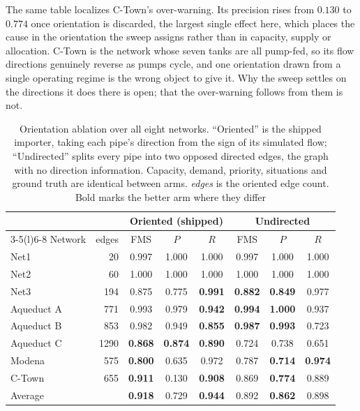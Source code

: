 \documentclass[11pt]{article}
\begin{document}
The same table localizes C-Town's over-warning. Its precision rises from $0.130$ to
$0.774$ once orientation is discarded, the largest single effect here, which places the
cause in the orientation the sweep assigns rather than in capacity, supply or
allocation. C-Town is the network whose seven tanks are all pump-fed, so its flow
directions genuinely reverse as pumps cycle, and one orientation drawn from a single
operating regime is the wrong object to give it. Why the sweep settles on the
directions it does there is open; that the over-warning follows from them is not.

\begin{table}[t]
\centering
\caption{Orientation ablation over all eight networks. ``Oriented'' is the shipped
importer, taking each pipe's direction from the sign of its simulated flow;
``Undirected'' splits every pipe into two opposed directed edges, the graph with no
direction information. Capacity, demand, priority, situations and ground truth are
identical between arms. \emph{edges} is the oriented edge count. Bold marks the better
arm where they differ}\label{tab:orient}
\small
\begin{tabular}{lrccc@{\hskip 1.5em}ccc}
\toprule
 & & \multicolumn{3}{c}{Oriented (shipped)} & \multicolumn{3}{c}{Undirected} \\
\cmidrule(lr){3-5}\cmidrule(l){6-8}
Network & edges & FMS & $P$ & $R$ & FMS & $P$ & $R$ \\
\midrule
Net1       &   20 & 0.997 & 1.000 & 1.000 & 0.997 & 1.000 & 1.000 \\
Net2       &   60 & 1.000 & 1.000 & 1.000 & 1.000 & 1.000 & 1.000 \\
Net3       &  194 & 0.875 & 0.775 & \textbf{0.991} & \textbf{0.882} & \textbf{0.849} & 0.977 \\
Aqueduct A &  771 & 0.993 & 0.979 & \textbf{0.942} & \textbf{0.994} & \textbf{1.000} & 0.937 \\
Aqueduct B &  853 & 0.982 & 0.949 & \textbf{0.855} & \textbf{0.987} & \textbf{0.993} & 0.723 \\
Aqueduct C & 1290 & \textbf{0.868} & \textbf{0.874} & \textbf{0.890} & 0.724 & 0.738 & 0.651 \\
Modena     &  575 & \textbf{0.800} & 0.635 & 0.972 & 0.787 & \textbf{0.714} & \textbf{0.974} \\
C-Town     &  655 & \textbf{0.911} & 0.130 & \textbf{0.908} & 0.869 & \textbf{0.774} & 0.889 \\
\midrule
Average    &      & \textbf{0.918} & 0.729 & \textbf{0.944} & 0.892 & \textbf{0.862} & 0.898 \\
\bottomrule
\end{tabular}
\end{table}
\end{document}

